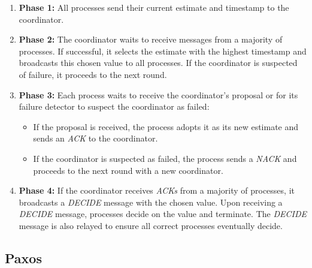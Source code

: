 \begin{enumerate}
  \item \textbf{Phase 1:} All processes send their current estimate and timestamp to the coordinator.
  \item \textbf{Phase 2:} The coordinator waits to receive messages from a majority of processes.
  If successful, it selects the estimate with the highest timestamp and broadcasts this chosen
  value to all processes. If the coordinator is suspected of failure, it proceeds to the next round.
  \item \textbf{Phase 3:} Each process waits to receive the coordinator's proposal or for
  its failure detector to suspect the coordinator as failed:
  \begin{itemize}
    \item If the proposal is received, the process adopts it as its new estimate and sends
    an \textit{ACK} to the coordinator.
    \item If the coordinator is suspected as failed, the process sends a \textit{NACK} and proceeds
    to the next round with a new coordinator.
  \end{itemize}
  \item \textbf{Phase 4:} If the coordinator receives \textit{ACKs} from a majority of processes,
  it broadcasts a \textit{DECIDE} message with the chosen value. Upon receiving a \textit{DECIDE}
  message, processes decide on the value and terminate. The \textit{DECIDE} message is also
  relayed to ensure all correct processes eventually decide.
\end{enumerate}

\subsection{Paxos}\label{sub:paxos}

